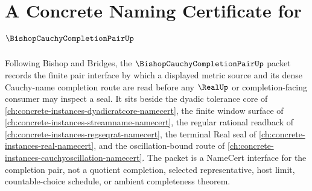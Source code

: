 \chapter{A Concrete Naming Certificate for $\BishopCauchyCompletionPairUp$}
\label{ch:concrete-instances-bishop-cauchy-completion-pair-namecert}

Following Bishop and Bridges, the $\BishopCauchyCompletionPairUp$ packet records the finite pair interface by which a displayed metric source and its dense Cauchy-name completion route are read before any $\RealUp$ or completion-facing consumer may inspect a seal. It sits beside the dyadic tolerance core of \autoref{ch:concrete-instances-dyadicratcore-namecert}, the finite window surface of \autoref{ch:concrete-instances-streamname-namecert}, the regular rational readback of \autoref{ch:concrete-instances-regseqrat-namecert}, the terminal Real seal of \autoref{ch:concrete-instances-real-namecert}, and the oscillation-bound route of \autoref{ch:concrete-instances-cauchyoscillation-namecert}. The packet is a NameCert interface for the completion pair, not a quotient completion, selected representative, host limit, countable-choice schedule, or ambient completeness theorem.

